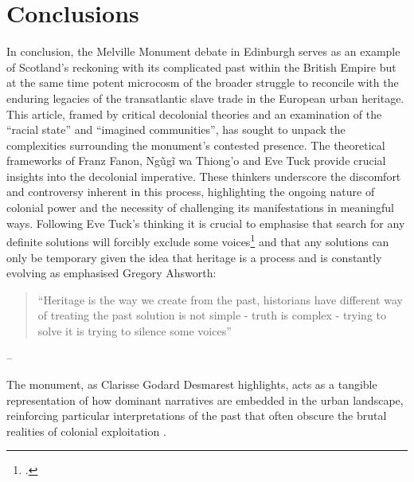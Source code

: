 \documentclass{scrartcl}
\renewcommand{\cite}{\parencite}
\begin{document}
\section{Conclusions}

In conclusion, the Melville Monument debate in Edinburgh serves as an example of Scotland's reckoning with its complicated past within the British Empire but at the same time potent microcosm of the broader struggle to reconcile with the enduring legacies of the transatlantic slave trade in the European urban heritage. This article, framed by critical decolonial theories and an examination of the ``racial state'' and ``imagined communities'', has sought to unpack the complexities surrounding the monument's contested presence. The theoretical frameworks of Franz Fanon, Ngũgĩ wa Thiong'o and Eve Tuck provide crucial insights into the decolonial imperative. These thinkers underscore the discomfort and controversy inherent in this process, highlighting the ongoing nature of colonial power and the necessity of challenging its manifestations in meaningful ways.
Following Eve Tuck's thinking it is crucial to emphasise that search for any definite solutions will forcibly exclude some voices\footcite["Actually, we argue, attending to what is irreconcilable within settler colonial relations and what is incommensurable between decolonizing projects and other social justice projects will help to reduce the frustration of attempts at solidarity; but the attention won’t get anyone off the hook from the hard, unsettling work of decolonization. Thus, we also include a discussion of interruptions that unsettle innocence and recognize incommensurability."
][p.4]{eve_tuck_k_wayne_yang_decolonization_2012} and that any solutions can only be temporary given the idea that heritage is a process and is constantly evolving as emphasised Gregory Ahsworth: 

\begin{quotation}
``Heritage is the way we create from the past, historians have different way of treating the past solution is not simple - truth is complex - trying to solve it is trying to silence some voices'' 
\end{quotation}
\begin{flushright}
-- \cite[][]{gregory_ashworth_interview_2008} 
\end{flushright}

The monument, as Clarisse Godard Desmarest highlights, acts as a tangible representation of how dominant narratives are embedded in the urban landscape, reinforcing particular interpretations of the past that often obscure the brutal realities of colonial exploitation \cite[][]{godard_2018}.
\end{document}
